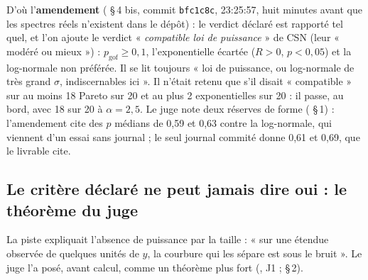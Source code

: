 D'où l'\textbf{amendement} ( §\,4 bis, commit \texttt{bfc1c8c}, 23:25:57, huit minutes avant que les spectres réels n'existent dans le dépôt) : le verdict déclaré est rapporté tel quel, et l'on ajoute le verdict « \emph{compatible loi de puissance} » de CSN (leur « modéré ou mieux ») : $p_{\mathrm{gof}} \ge 0{,}1$, l'exponentielle écartée ($R > 0$, $p < 0{,}05$) et la log-normale non préférée. Il se lit toujours « loi de puissance, ou log-normale de très grand $\sigma$, indiscernables ici ». Il n'était retenu que s'il disait « compatible » sur au moins 18 Pareto sur 20 et au plus 2 exponentielles sur 20 : il passe, au bord, avec 18 sur 20 à $\alpha = 2{,}5$. Le juge note deux réserves de forme ( §\,1) : l'amendement cite des $p$ médians de 0,59 et 0,63 contre la log-normale, qui viennent d'un essai sans journal ; le seul journal commité donne 0,61 et 0,69, que le livrable cite.

\subsection{Le critère déclaré ne peut jamais dire oui : le théorème du juge}\label{t3spe:sec:theoreme}

La piste expliquait l'absence de puissance par la taille : « sur une étendue observée de quelques unités de $y$, la courbure qui les sépare est sous le bruit ». Le juge l'a posé, avant calcul, comme un théorème plus fort (, J1 ;  §\,2).


